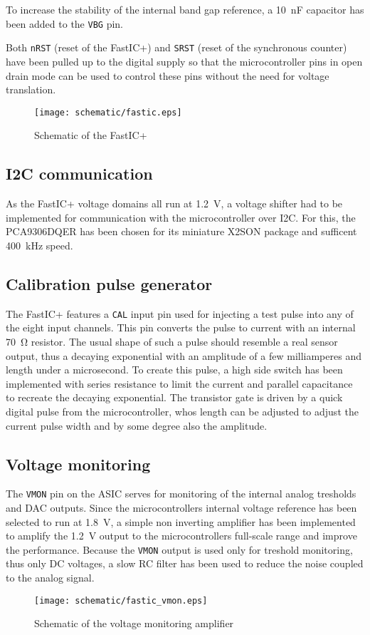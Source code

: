 To increase the stability of the internal band gap reference, a \SI{10}{\nano\farad} capacitor has been added to the \verb|VBG| pin.

Both \verb|nRST| (reset of the FastIC+) and \verb|SRST| (reset of the synchronous counter) have been pulled up to the digital supply so that the microcontroller pins in open drain mode can be used to control these pins without the need for voltage translation. 

\FloatBarrier
\begin{figure}[htp!]
    \centering
    \texttt{[image: schematic/fastic.eps]}
    \caption{Schematic of the FastIC+}
    \label{fig:fastic}
\end{figure}
\FloatBarrier


%
\subsection{I2C communication}
As the FastIC+ voltage domains all run at \SI{1.2}{\volt}, a voltage shifter had to be implemented for communication with the microcontroller over I2C. For this, the PCA9306DQER has been chosen for its miniature X2SON package and sufficent \SI{400}{\kilo\hertz} speed. 
%
\subsection{Calibration pulse generator}
The FastIC+ features a \verb|CAL| input pin used for injecting a test pulse into any of the eight input channels. This pin converts the pulse to current with an internal \SI{70}{\ohm} resistor. The usual shape of such a pulse should resemble a real sensor output, thus a decaying exponential with an amplitude of a few milliamperes and length under a microsecond. To create this pulse, a high side switch has been implemented with series resistance to limit the current and parallel capacitance to recreate the decaying exponential. The transistor gate is driven by a quick digital pulse from the microcontroller, whos length can be adjusted to adjust the current pulse width and by some degree also the amplitude. 
%
\subsection{Voltage monitoring}
%
The \verb|VMON| pin on the ASIC serves for monitoring of the internal analog tresholds and DAC outputs. Since the microcontrollers internal voltage reference has been selected to run at \SI{1.8}{\volt}, a simple non inverting amplifier has been implemented to amplify the \SI{1.2}{\volt} output to the microcontrollers full-scale range and improve the performance. Because the \verb|VMON| output is used only for treshold monitoring, thus only DC voltages, a slow RC filter has been used to reduce the noise coupled to the analog signal.
%
\FloatBarrier
\begin{figure}[htp!]
    \centering
    \texttt{[image: schematic/fastic\_vmon.eps]}
    \caption{Schematic of the voltage monitoring amplifier}
    \label{fig:fastic_vmon}
\end{figure}
\FloatBarrier
%

